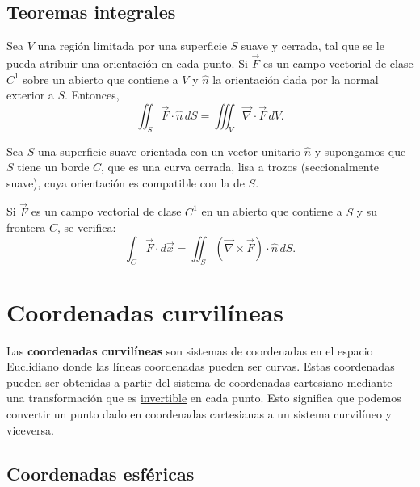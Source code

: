 \subsection{Teoremas integrales}

\begin{teorema}[de Gauss] \label{Gauss}
    Sea $V$ una región limitada por una superficie $S$ suave y cerrada, tal que se le pueda atribuir una orientación en cada punto. Si $\vec{F}$ es un campo vectorial de clase $C^1$ sobre un abierto que contiene a $V$ y $\hat{n}$ la orientación dada por la normal exterior a $S$. Entonces,
    \begin{equation}
    \boxed{\iint_S \vec{F} \cdot \hat{n}\,dS = \iiint_V \vec{\nabla} \cdot \vec{F}\, dV.} 
    \end{equation}
\end{teorema}

\begin{teorema}[de Stokes] \label{Stokes}
    Sea $S$ una superficie suave orientada con un vector unitario $\hat{n}$ y supongamos que $S$ tiene un borde $C$, que es una curva cerrada, lisa a trozos (seccionalmente suave), cuya orientación es compatible con la de $S$.

    Si $\vec{F}$ es un campo vectorial de clase $C^1$ en un abierto que contiene a $S$ y su frontera $C$, se verifica:
    \begin{equation}
    \boxed{\int_C \vec{F} \cdot d\vec{x} = \iint_S (\vec{\nabla} \times \vec{F}) \cdot \hat{n}\,dS.}
    \end{equation}
\end{teorema}

\section{Coordenadas curvilíneas}

Las \textbf{coordenadas curvilíneas} son sistemas de coordenadas en el espacio Euclidiano donde las líneas coordenadas pueden ser curvas. Estas coordenadas pueden ser obtenidas a partir del sistema de coordenadas cartesiano mediante una transformación que es \underline{invertible} en cada punto. Esto significa que podemos convertir un punto dado en coordenadas cartesianas a un sistema curvilíneo y viceversa.

\subsection{Coordenadas esféricas}

